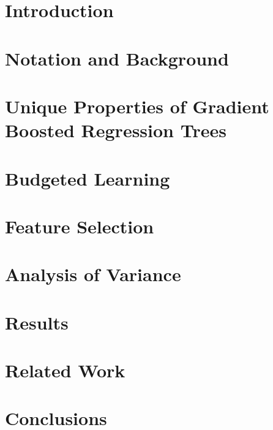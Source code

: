 \documentclass[twoside,11pt]{article}
\begin{document}
\section{Introduction}


\section{Notation and Background}
\label{sec:background}


\section{Unique Properties of Gradient Boosted Regression Trees}
\label{sec:gbrt}


\section{Budgeted Learning}
\label{sec:greedymiser}


\section{Feature Selection}
\label{sec:gbfs}


\section{Analysis of Variance}
\label{sec:variance}


\section{Results}
\label{sec:results}


\section{Related Work}
\label{sec:related}


\section{Conclusions}
\label{sec:conclude}





\newpage

\appendix

\vskip 0.1in

\end{document}

